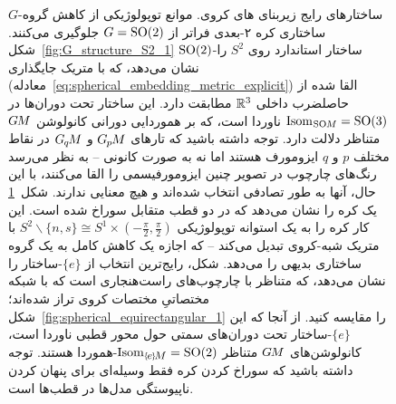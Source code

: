 \begin{figure}
\begin{subfigure}[b]{0.48\textwidth}
{        }
        \label{fig:G_structure_S2_2}
    \end{subfigure}
    \vspace*{2ex}
    \caption{\small
        $G$-ساختارهای رایج زیربنای های کروی.
        موانع توپولوژیکی از کاهش گروه ساختاری کره ۲-بعدی فراتر از $G=\operatorname{SO}(2)$ جلوگیری می‌کنند.
        شکل~\ref{fig:G_structure_S2_1} $\operatorname{SO}(2)$-ساختار استاندارد روی $S^2$ را نشان می‌دهد، که با متریک جایگذاری (معادله~\eqref{eq:spherical_embedding_metric_explicit}) القا شده از حاصلضرب داخلی $\mathbb{R}^3$ مطابقت دارد.
        این ساختار تحت دوران‌ها در $\protect\operatorname{Isom}_{\mkern1mu\operatorname{SO}\mkern-3.6muM} = \operatorname{SO}(3)$ ناوردا است، که بر هموردایی دورانی کانولوشن $G\mkern-1.4muM$ متناظر دلالت دارد.
        توجه داشته باشید که تارهای $G_{\mkern-1.3mu p}\mkern-1.2muM$ و $G_{\mkern-1.3mu q}\mkern-1.3muM$ در نقاط مختلف $p$ و $q$ ایزومورف هستند اما نه به صورت کانونی -- به نظر می‌رسد رنگ‌های چارچوب در تصویر چنین ایزومورفیسمی را القا می‌کنند، با این حال، آنها به طور تصادفی انتخاب شده‌اند و هیچ معنایی ندارند.
        شکل~\ref{fig:G_structure_S2_2} یک کره را نشان می‌دهد که در دو قطب متقابل سوراخ شده است.
        این کار کره را به یک استوانه توپولوژیکی $S^2 \backslash \{n,s\} \cong S^1\times(-\frac{\pi}{2},\frac{\pi}{2})$ با متریک شبه-کروی تبدیل می‌کند -- که اجازه یک کاهش کامل به یک گروه ساختاری بدیهی را می‌دهد.
        شکل، رایج‌ترین انتخاب از $\{e\}$-ساختار را نشان می‌دهد، که متناظر با چارچوب‌های راست‌هنجاری است که با شبکه مختصاتیِ مختصات کروی تراز شده‌اند؛ شکل~\ref{fig:spherical_equirectangular_1} را مقایسه کنید.
        از آنجا که این $\{e\}$-ساختار تحت دوران‌های سمتی حول محور قطبی ناوردا است، کانولوشن‌های $G\mkern-1.4muM$ متناظر $\protect\IsomeM = \SO2$-هموردا هستند.
        توجه داشته باشید که سوراخ کردن کره فقط وسیله‌ای برای پنهان کردن ناپیوستگی مدل‌ها در قطب‌ها است.
    }
    \label{fig:G_structures_S2_main}
\end{figure}